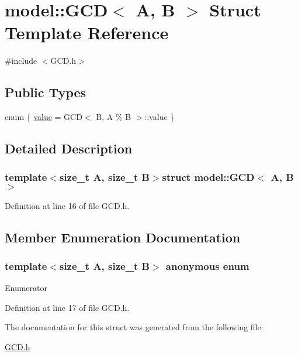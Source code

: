 \hypertarget{structmodel_1_1_g_c_d}{}\section{model\+:\+:G\+C\+D$<$ A, B $>$ Struct Template Reference}
\label{structmodel_1_1_g_c_d}


{\ttfamily \#include $<$G\+C\+D.\+h$>$}

\subsection*{Public Types}
\begin{DoxyCompactItemize}
\item 
enum \{ \hyperlink{structmodel_1_1_g_c_d_aad59c07799de21f16f6365d52ecba471a4b1db62a1c4153370b8a309ca94e32c8}{value} = G\+C\+D$<$ B, A \% B $>$\+:\+:value
 \}
\end{DoxyCompactItemize}


\subsection{Detailed Description}
\subsubsection*{template$<$size\+\_\+t A, size\+\_\+t B$>$struct model\+::\+G\+C\+D$<$ A, B $>$}



Definition at line 16 of file G\+C\+D.\+h.



\subsection{Member Enumeration Documentation}
\hypertarget{structmodel_1_1_g_c_d_aad59c07799de21f16f6365d52ecba471}{}\subsubsection[{anonymous enum}]{\setlength{\rightskip}{0pt plus 5cm}template$<$size\+\_\+t A, size\+\_\+t B$>$ anonymous enum}\label{structmodel_1_1_g_c_d_aad59c07799de21f16f6365d52ecba471}
\begin{Desc}
\item[Enumerator]\par
\begin{description}
\item[{\em 
\hypertarget{structmodel_1_1_g_c_d_aad59c07799de21f16f6365d52ecba471a4b1db62a1c4153370b8a309ca94e32c8}{}value\label{structmodel_1_1_g_c_d_aad59c07799de21f16f6365d52ecba471a4b1db62a1c4153370b8a309ca94e32c8}
}]\end{description}
\end{Desc}


Definition at line 17 of file G\+C\+D.\+h.



The documentation for this struct was generated from the following file\+:\begin{DoxyCompactItemize}
\item 
\hyperlink{_g_c_d_8h}{G\+C\+D.\+h}\end{DoxyCompactItemize}
